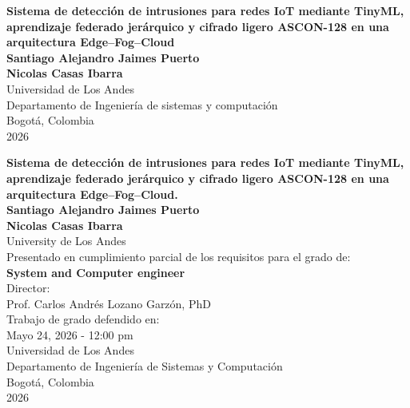 \begin{center}
\begin{figure}
\centering%
%
\end{figure}
\thispagestyle{empty} \vspace*{1.0cm} \textbf{\Large
Sistema de detección de intrusiones para redes IoT mediante TinyML, aprendizaje federado jerárquico y cifrado ligero ASCON-128 en una arquitectura Edge--Fog--Cloud}\\[4.0cm]
\Large\textbf{Santiago Alejandro Jaimes Puerto}\\
\Large\textbf{Nicolas Casas Ibarra}\\[5.0cm]
\small Universidad de Los Andes\\
Departamento de Ingeniería de sistemas y computación\\
Bogotá, Colombia\\
2026\\
\end{center}

\newpage{\pagestyle{empty}\cleardoublepage}

\newpage
\begin{center}
\thispagestyle{empty} \vspace*{0cm} \textbf{\Large Sistema de detección de intrusiones para redes IoT mediante TinyML, aprendizaje federado jerárquico y cifrado ligero ASCON-128 en una arquitectura Edge--Fog--Cloud.}\\[3.0cm]
\Large\textbf{Santiago Alejandro Jaimes Puerto}\\
\Large\textbf{Nicolas Casas Ibarra}\\[3.0cm]
\small University de Los Andes\\
\small Presentado en cumplimiento parcial de los requisitos para el grado de:\\
\textbf{System and Computer engineer}\\[2.0cm]
Director:\\
Prof. Carlos Andrés Lozano Garzón, PhD\\

Trabajo de grado defendido en:\\
Mayo 24, 2026 - 12:00 pm \\[1.5cm]
Universidad de Los Andes\\
Departamento de Ingeniería de Sistemas y Computación\\
Bogotá, Colombia\\
2026\\
\end{center}

